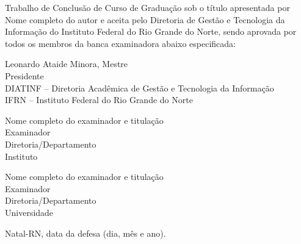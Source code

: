 \begin{folhadeaprovacao}
	\setlength{\ABNTsignthickness}{0.4pt}
	\setlength{\ABNTsignwidth}{10cm}

	\noindent
	Trabalho de Conclusão de Curso de Graduação sob o título
	\textit{\ABNTtitulodata} apresentada por Nome completo do autor e aceita pelo Diretoria
	de Gestão e Tecnologia da Informação do Instituto Federal do Rio Grande do
	Norte, sendo aprovada por todos os membros da banca examinadora abaixo especificada:

	\assinatura
	{
		Leonardo Ataide Minora, Mestre   			                  \\
		{\small Presidente}											          \smallskip\\
		{\footnotesize
			DIATINF -- Diretoria Acadêmica de Gestão e Tecnologia da Informação		   \\
		  	IFRN -- Instituto Federal do Rio Grande do Norte
		}
   }

   \assinatura
	{
      Nome completo do examinador e titulação   			                  \\
		{\small Examinador}											          \smallskip\\
		{\footnotesize
			Diretoria/Departamento		\\
		  	Instituto
		}
   }

   \assinatura
	{
      Nome completo do examinador e titulação   			                  \\
		{\small Examinador}											          \smallskip\\
		{\footnotesize
			Diretoria/Departamento		\\
		  	Universidade
		}
	}

	\vfill

	\begin{center}
		Natal-RN, data da defesa (dia, mês e ano).
	\end{center}
\end{folhadeaprovacao}
